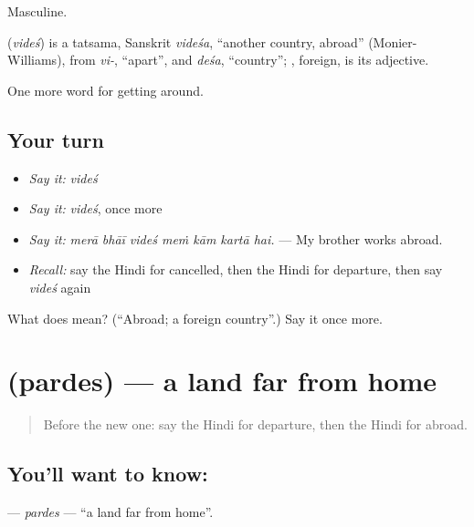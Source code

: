 Masculine.

\begin{cousinweb}
\textbf{} (\emph{videś}) is a tatsama, Sanskrit \emph{videśa}, \textquotedblleft{}another country, abroad\textquotedblright{} (Monier-Williams), from \emph{vi-}, \textquotedblleft{}apart\textquotedblright{}, and \emph{deśa}, \textquotedblleft{}country\textquotedblright{}; , foreign, is its adjective.
\end{cousinweb}

\begin{grammarlens}[title={What you've built}]
One more word for getting around.
\end{grammarlens}

\subsection*{Your turn}
\begin{itemize}
\raggedright
  \item \emph{Say it:} \emph{videś}
  \item \emph{Say it:} \emph{videś}, once more
  \item \emph{Say it:} \emph{merā bhāī videś meṁ kām kartā hai.} — My brother works abroad.
  \item \emph{Recall:} say the Hindi for cancelled, then the Hindi for departure, then say \emph{videś} again
\end{itemize}

\begin{tcolorbox}[breakable,colback=teal!4,colframe=teal!35!black,title={Before you move on}]
What does  mean? (\textquotedblleft{}Abroad; a foreign country\textquotedblright{}.) Say it once more.
\end{tcolorbox}
\section[\texorpdfstring{\hi{परदेस} (pardes)}{परदेस (pardes)}]{ (pardes) — a land far from home}

\label{lesson:HI-C412-pardes}



\begin{quote}
Before the new one: say the Hindi for departure, then the Hindi for abroad.
\end{quote}

\subsection*{You'll want to know: }
\textbf{} — \emph{pardes} — \textquotedblleft{}a land far from home\textquotedblright{}.

